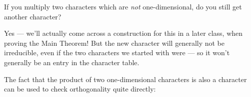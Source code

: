 \begin{question}
If you multiply two characters which are \emph{not} one-dimensional, do you still get another character?
\end{question}

\begin{ans}
Yes --- we'll actually come across a construction for this in a later class, when proving the Main Theorem! But the new character will generally not be irreducible, even if the two characters we started with were --- so it won't generally be an entry in the character table. 
\end{ans}

The fact that the product of two one-dimensional characters is also a character can be used to check orthogonality quite directly:



